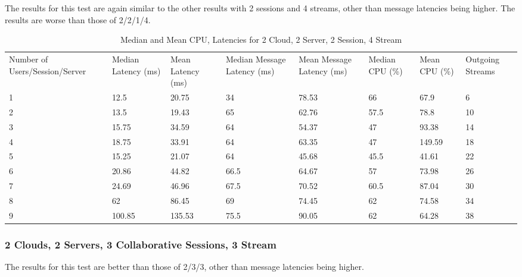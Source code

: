 The results for this test are again similar to the other results with 2 sessions and 4 streams, other than message latencies being higher. The results are worse than those of 2/2/1/4.

\begin{table}
\caption{Median and Mean CPU, Latencies for 2 Cloud, 2 Server, 2 Session, 4 Stream}
\label{table:2cld_2serv_2sess_4str}
\begin{tabu} to\linewidth{|X[c]|X[c]|X[c]|X[c]|X[c]|X[c]|X[c]|X[c]|}
\everyrow{\hline}
\hline
Number of Users/Session/Server & Median Latency (ms) & Mean Latency (ms) & Median Message Latency (ms) & Mean Message Latency (ms) & Median CPU (\%) & Mean CPU (\%) & Outgoing Streams\\
1 & 12.5 & 20.75 & 34 & 78.53 & 66 & 67.9 & 6 \\
2 & 13.5 & 19.43 & 65 & 62.76 & 57.5 & 78.8 & 10 \\
3 & 15.75 & 34.59 & 64 & 54.37 & 47 & 93.38 & 14 \\
4 & 18.75 & 33.91 & 64 & 63.35 & 47 & 149.59 & 18 \\
5 & 15.25 & 21.07 & 64 & 45.68 & 45.5 & 41.61 & 22 \\
6 & 20.86 & 44.82 & 66.5 & 64.67 & 57 & 73.98 & 26 \\
7 & 24.69 & 46.96 & 67.5 & 70.52 & 60.5 & 87.04 & 30 \\
8 & 62 & 86.45 & 69 & 74.45 & 62 & 74.58 & 34 \\
9 & 100.85 & 135.53 & 75.5 & 90.05 & 62 & 64.28 & 38 \\
\end{tabu}
\end{table}

\clearpage\subsubsection{2 Clouds, 2 Servers, 3 Collaborative Sessions, 3 Stream}

The results for this test are better than those of 2/3/3, other than message latencies being higher.

